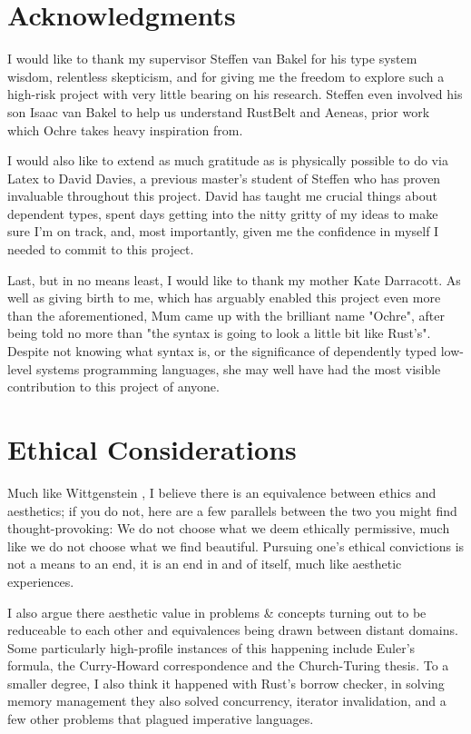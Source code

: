 \documentclass[12pt,twoside]{report}
\begin{document}
\cleardoublepage
\section*{Acknowledgments}
I would like to thank my supervisor Steffen van Bakel for his type system wisdom, relentless skepticism, and for giving me the freedom to explore such a high-risk project with very little bearing on his research. Steffen even involved his son Isaac van Bakel to help us understand RustBelt and Aeneas, prior work which Ochre takes heavy inspiration from.

I would also like to extend as much gratitude as is physically possible to do via Latex to David Davies, a previous master's student of Steffen who has proven invaluable throughout this project. David has taught me crucial things about dependent types, spent days getting into the nitty gritty of my ideas to make sure I'm on track, and, most importantly, given me the confidence in myself I needed to commit to this project.



Last, but in no means least, I would like to thank my mother Kate Darracott. As well as giving birth to me, which has arguably enabled this project even more than the aforementioned, Mum came up with the brilliant name "Ochre", after being told no more than "the syntax is going to look a little bit like Rust's". Despite not knowing what syntax is, or the significance of dependently typed low-level systems programming languages, she may well have had the most visible contribution to this project of anyone. 

\newpage
\section*{Ethical Considerations}
Much like Wittgenstein \citep[proposition 6.421]{wittgensteinTractatusLogicophilosophicus1922}, I believe there is an equivalence between ethics and aesthetics; if you do not, here are a few parallels between the two you might find thought-provoking: We do not choose what we deem ethically permissive, much like we do not choose what we find beautiful. Pursuing one's ethical convictions is not a means to an end, it is an end in and of itself, much like aesthetic experiences.

I also argue there aesthetic value in problems \& concepts turning out to be reduceable to each other and equivalences being drawn between distant domains. Some particularly high-profile instances of this happening include Euler's formula, the Curry-Howard correspondence and the Church-Turing thesis. To a smaller degree, I also think it happened with Rust's borrow checker, in solving memory management they also solved concurrency, iterator invalidation, and a few other problems that plagued imperative languages.
\end{document}
